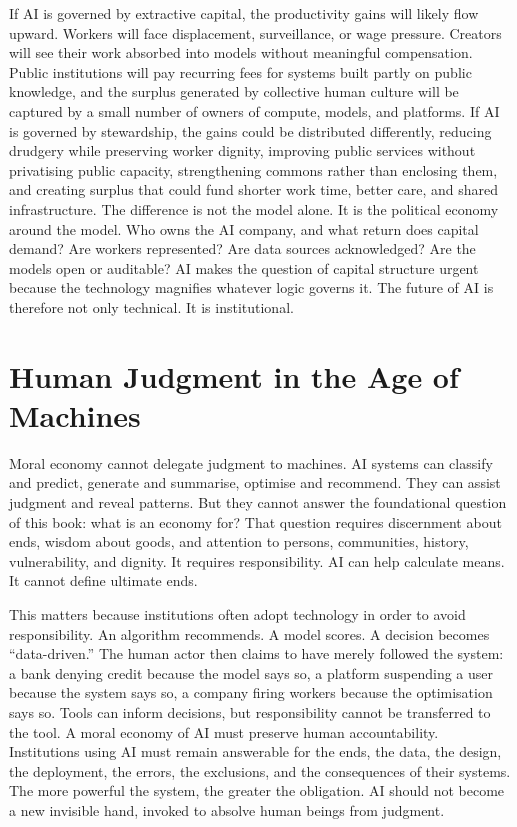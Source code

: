 \documentclass[11pt,a4paper,oneside]{book}
\begin{document}
If AI is governed by extractive capital, the productivity gains will likely flow upward. Workers will face displacement, surveillance, or wage pressure. Creators will see their work absorbed into models without meaningful compensation. Public institutions will pay recurring fees for systems built partly on public knowledge, and the surplus generated by collective human culture will be captured by a small number of owners of compute, models, and platforms. If AI is governed by stewardship, the gains could be distributed differently, reducing drudgery while preserving worker dignity, improving public services without privatising public capacity, strengthening commons rather than enclosing them, and creating surplus that could fund shorter work time, better care, and shared infrastructure. The difference is not the model alone. It is the political economy around the model. Who owns the AI company, and what return does capital demand? Are workers represented? Are data sources acknowledged? Are the models open or auditable? AI makes the question of capital structure urgent because the technology magnifies whatever logic governs it. The future of AI is therefore not only technical. It is institutional.

\section*{Human Judgment in the Age of Machines}

Moral economy cannot delegate judgment to machines. AI systems can classify and predict, generate and summarise, optimise and recommend. They can assist judgment and reveal patterns. But they cannot answer the foundational question of this book: what is an economy for? That question requires discernment about ends, wisdom about goods, and attention to persons, communities, history, vulnerability, and dignity. It requires responsibility. AI can help calculate means. It cannot define ultimate ends.

This matters because institutions often adopt technology in order to avoid responsibility. An algorithm recommends. A model scores. A decision becomes ``data-driven.'' The human actor then claims to have merely followed the system: a bank denying credit because the model says so, a platform suspending a user because the system says so, a company firing workers because the optimisation says so. Tools can inform decisions, but responsibility cannot be transferred to the tool. A moral economy of AI must preserve human accountability. Institutions using AI must remain answerable for the ends, the data, the design, the deployment, the errors, the exclusions, and the consequences of their systems. The more powerful the system, the greater the obligation. AI should not become a new invisible hand, invoked to absolve human beings from judgment.
\end{document}
